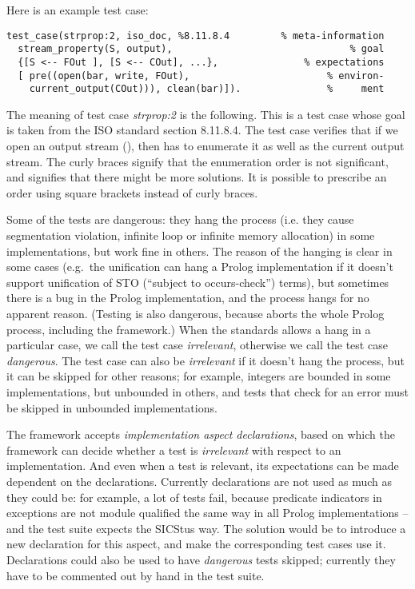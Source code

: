 \documentclass[draft]{llncs}%
\begin{document}
\noindent
Here is an example test case:
%
\begin{verbatim}
test_case(strprop:2, iso_doc, %8.11.8.4         % meta-information
  stream_property(S, output),                               % goal
  {[S <-- FOut ], [S <-- COut], ...},               % expectations
  [ pre((open(bar, write, FOut),                        % environ-
    current_output(COut))), clean(bar)]).               %     ment
\end{verbatim}
%
The meaning of test case \emph{strprop:2} is the following. This
is a test case whose goal is taken from the ISO standard section 8.11.8.4. 
The test case verifies that if we open an output stream (), then
 has to
enumerate it as well as the current
output stream. The curly braces signify that the enumeration order is not 
significant, and  signifies that there might be more solutions.
It is possible to prescribe an order using square brackets instead of curly
braces.

Some of the tests are dangerous: they hang the process (i.e. they cause
segmentation violation, infinite loop or infinite memory allocation)
in some implementations, but work fine in others. The reason of the hanging
is clear in some cases (e.g.\ the unification
 can hang a Prolog implementation if it doesn't support
unification of STO (``subject to occurs-check'') terms), but sometimes there is
a bug in the Prolog implementation, and the process hangs for no apparent
reason. (Testing  is also dangerous, because 
aborts the whole Prolog process, including the framework.)
When the standards allows a hang in a particular case,
we call the test case \emph{irrelevant}, otherwise we call the test
case \emph{dangerous}. The test case can also be \emph{irrelevant} if it
doesn't hang the process, but it can be skipped for other reasons; for example,
integers are bounded in some implementations, but unbounded in others, and
tests that check for an  error must be skipped in
unbounded implementations.

The framework accepts \emph{implementation aspect declarations},
based on which the framework can decide whether a test is
\emph{irrelevant} with respect to an implementation. And even when a test is
relevant, its expectations can be made dependent on the declarations.
Currently
declarations are not used as much as they could be: for example, a lot of
tests fail, because predicate indicators in exceptions are not module
qualified the same way in all Prolog implementations -- and the test suite
expects the SICStus way. The solution would be to introduce a new
declaration for this aspect, and make the corresponding test cases use it.
Declarations could also be used to have \emph{dangerous} tests skipped;
currently they have to be commented out by hand in the test suite.
\end{document}
